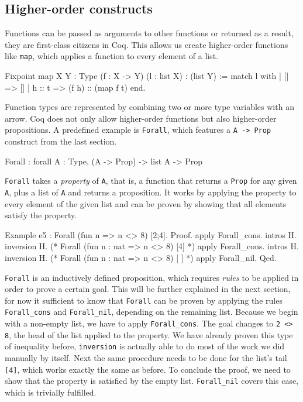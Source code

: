 \documentclass[paper = a4, fleqn, twoside]{scrreprt}
\newcommand{\coqinline}[1]{\texttt{#1}}
\begin{document}
\subsection{Higher-order constructs}
Functions can be passed as arguments to other functions or returned as a result, they are first-class citizens in Coq. This allows us create higher-order functions like \coqinline{map}, which applies a function to every element of a list.
\begin{coqcode}
Fixpoint map {X Y : Type} (f : X -> Y) (l : list X) : (list Y) :=
  match l with
  | []     => []
  | h :: t => (f h) :: (map f t)
  end.
\end{coqcode}
Function types are represented by combining two or more type variables with an arrow. Coq does not only allow higher-order functions but also higher-order propositions. A predefined example is \coqinline{Forall}, which features a \coqinline{A -> Prop} construct from the last section.
\begin{coqcode}
Forall : forall A : Type, (A -> Prop) -> list A -> Prop
\end{coqcode}
\coqinline{Forall} takes a \textit{property} of \coqinline{A}, that is, a function that returns a \coqinline{Prop} for any given \coqinline{A}, plus a list of \coqinline{A} and returns a proposition. It works by applying the property to every element of the given list and can be proven by showing that all elements satisfy the property.
\begin{coqcode}
Example e5 : Forall (fun n => n <> 8) [2;4].
Proof.
apply Forall_cons. intros H. inversion H.
(* Forall (fun n : nat => n <> 8) [4] *)
apply Forall_cons. intros H. inversion H.
(* Forall (fun n : nat => n <> 8) [ ] *)
apply Forall_nil.
Qed.
\end{coqcode}
\coqinline{Forall} is an inductively defined proposition, which requires \textit{rules} to be applied in order to prove a certain goal. This will be further explained in the next section, for now it sufficient to know that \coqinline{Forall} can be proven by applying the rules \coqinline{Forall_cons} and \coqinline{Forall_nil}, depending on the remaining list. Because we begin with a non-empty list, we have to apply \coqinline{Forall_cons}. The goal changes to \coqinline{2 <> 8}, the head of the list applied to the property. We have already proven this type of inequality before, \coqinline{inversion} is actually able to do most of the work we did manually by itself. Next the same procedure needs to be done for the list's tail \coqinline{[4]}, which works exactly the same as before. To conclude the proof, we need to show that the property is satisfied by the empty list. \coqinline{Forall_nil} covers this case, which is trivially fulfilled.
\end{document}
